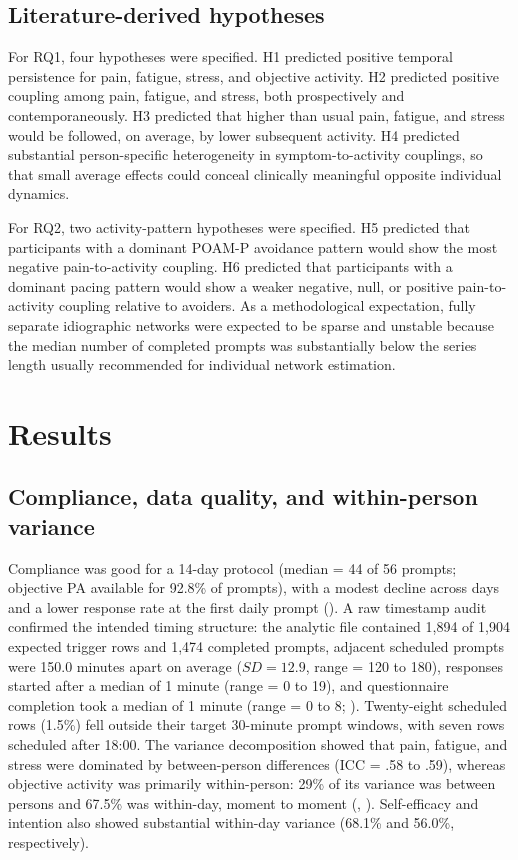 \documentclass[11pt,a4paper]{article}
\begin{document}
\subsection{Literature-derived hypotheses}
For RQ1, four hypotheses were specified. H1 predicted positive temporal persistence for
pain, fatigue, stress, and objective activity. H2 predicted positive coupling among pain,
fatigue, and stress, both prospectively and contemporaneously. H3 predicted that higher than
usual pain, fatigue, and stress would be followed, on average, by lower subsequent activity.
H4 predicted substantial person-specific heterogeneity in symptom-to-activity couplings, so
that small average effects could conceal clinically meaningful opposite individual dynamics.

For RQ2, two activity-pattern hypotheses were specified. H5 predicted that participants with
a dominant POAM-P avoidance pattern would show the most negative pain-to-activity coupling.
H6 predicted that participants with a dominant pacing pattern would show a weaker negative,
null, or positive pain-to-activity coupling relative to avoiders. As a methodological
expectation, fully separate idiographic networks were expected to be sparse and unstable
because the median number of completed prompts was substantially below the series length
usually recommended for individual network estimation.

\section{Results}

\subsection{Compliance, data quality, and within-person variance}
Compliance was good for a 14-day protocol (median = 44 of 56 prompts; objective PA available
for 92.8\% of prompts), with a modest decline across days and a lower response rate at the
first daily prompt (). A raw timestamp audit confirmed the intended timing
structure: the analytic file contained 1,894 of 1,904 expected trigger rows and 1,474
completed prompts, adjacent scheduled prompts were 150.0 minutes apart on average
($SD=12.9$, range = 120 to 180), responses started after a median of 1 minute
(range = 0 to 19), and questionnaire completion took a median of 1 minute (range = 0 to 8;
). Twenty-eight scheduled rows (1.5\%) fell outside their target
30-minute prompt windows, with seven rows scheduled after 18:00. The variance decomposition
showed that pain,
fatigue, and stress were dominated by between-person differences (ICC = .58 to .59), whereas
objective activity was primarily within-person: 29\% of its variance was between persons and
67.5\% was within-day, moment to moment (, ).
Self-efficacy and intention also showed substantial within-day variance (68.1\% and 56.0\%,
respectively).
\end{document}

